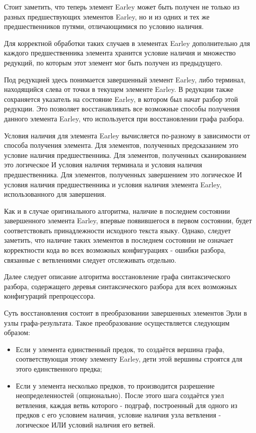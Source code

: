 Стоит заметить, что теперь элемент Earley может быть получен не только из разных предшествующих элементов Earley, но и из одних и тех же предшественников путями, отличающимися по условию наличия.

Для корректной обработки таких случаев в элементах Earley дополнительно для каждого предшественника элемента хранится условие наличия и множество редукций, по которым этот элемент мог быть получен из предыдущего.

Под редукцией здесь понимается завершенный элемент Earley, либо терминал, находящийся слева от точки в текущем элементе Earley. В редукции также сохраняется указатель на состояние Earley, в котором был начат разбор этой редукции. Это позволяет восстанавливать все возможные способы получения данного элемента Earley, что используется при восстановлении графа разбора.

Условия наличия для элемента Earley вычисляется по-разному в зависимости от способа получения элемента. Для элементов, полученных предсказанием это условие наличия предшественника. Для элементов, полученных сканированием это логическое И условия наличия терминала и условия наличия предшественника. Для элементов, полученных завершением это логическое И условия наличия предшественника и условия наличия элемента Earley, использованного для завершения.

Как и в случае оригинального алгоритма, наличие в последнем состоянии завершенного элемента Earley, впервые появившегося в первом состоянии, будет соответствовать принадлежности исходного текста языку. Однако, следует заметить, что наличие таких элементов в последнем состоянии не означает корректности кода во всех возможных конфигурациях - ошибки разбора, связанные с ветвлениями следует отслеживать отдельно.

Далее следует описание алгоритма восстановление графа синтаксического разбора, содержащего деревья синтаксического разбора для всех возможных конфигураций препроцессора.

Суть восстановления состоит в преобразовании завершенных элементов Эрли в узлы графа-результата. Такое преобразование осуществляется следующим образом:

\begin{itemize}
\item Если у элемента единственный предок, то создаётся вершина графа, соответствующая этому элементу Earley, дети этой вершины строятся для этого единственного предка;
\item Если у элемента несколько предков, то производится разрешение неопределенностей (опционально). После этого шага создаётся узел ветвления, каждая ветвь которого - подграф, построенный для одного из предков с его условием наличия, условие наличия узла ветвления - логическое ИЛИ условий наличия его ветвей.
\end{itemize}

